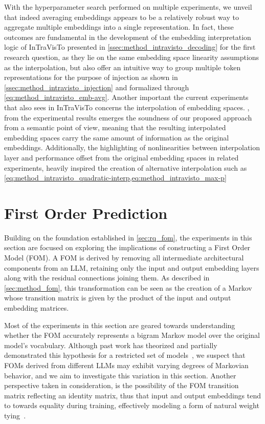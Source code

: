 With the hyperparameter search performed on multiple experiments, we unveil that indeed averaging embeddings appears to be a relatively robust way to aggregate multiple embeddings into a single representation.
In fact, these outcomes are fundamental in the development of the embedding interpretation logic of InTraVisTo presented in \cref{ssec:method_intravisto_decoding} for the first research question, as they lie on the same embedding space linearity assumptions as the interpolation, but also offer an intuitive way to group multiple token representations for the purpose of injection as shown in \cref{ssec:method_intravisto_injection} and formalized through \cref{eq:method_intravisto_emb-avg}.
Another important  the current experiments that also sees  in InTraVisTo concerns the interpolation of embedding spaces.
, from the experimental results emerges the soundness of our proposed approach from a semantic point of view, meaning that the resulting interpolated embedding spaces carry   the same amount of information as the original embeddings.
Additionally, the highlighting of nonlinearities between interpolation layer and performance offset from the original embedding spaces in related experiments, heavily inspired the creation of alternative interpolation  such as \cref{eq:method_intravisto_quadratic-interp,eq:method_intravisto_max-p}

\section{First Order Prediction}\label{sec:exp_fom}

Building on the foundation established in \cref{sec:rq_fom}, the experiments in this section are focused on exploring the implications of constructing a First Order Model (FOM).
A FOM is derived by removing all intermediate architectural components from an LLM, retaining only the input and output embedding layers along with the residual connections joining them.
As described in \cref{sec:method_fom}, this transformation can be seen as the creation of a Markov whose transition matrix is given by the product of the input and output embedding matrices.

Most of the experiments in this section are geared towards understanding whether the FOM accurately represents a bigram Markov model over the original model's vocabulary.
Although past work has theorized and partially demonstrated this hypothesis for a restricted set of models~\cite{elhage2021}, we suspect that FOMs derived from different LLMs may exhibit varying degrees of Markovian behavior, and we aim to investigate this variation in this section.
Another perspective taken in consideration, is the possibility of the FOM transition matrix reflecting an identity matrix, thus  that input and output embeddings tend to  towards equality during training, effectively modeling a form of natural weight tying~\cite{inan2017,press2017}.

